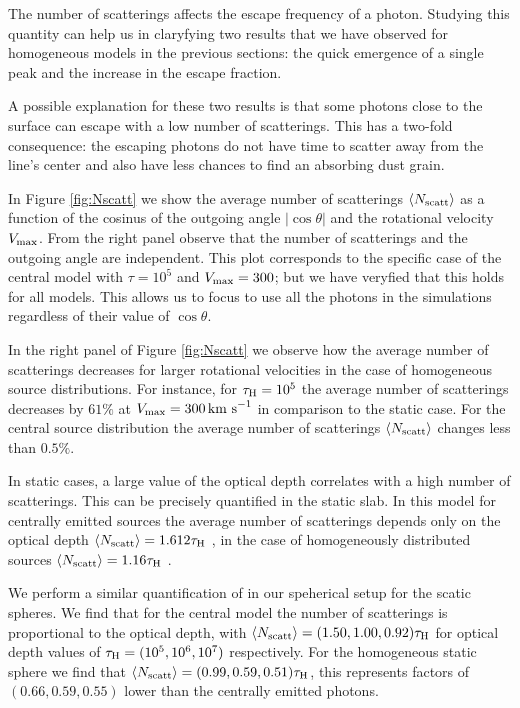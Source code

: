 \documentclass{emulateapj}
\newcommand{\ly}{{\ifmmode{{\rm Ly}\alpha~}\else{Ly$\alpha$~}\fi}}
\newcommand{\kms}{{\ifmmode{{\mathrm{\,km\ s}^{-1}}}\else{\,km~s$^{-1}$}\fi}}
\begin{document}
The number of scatterings affects the escape frequency of a \ly
photon. Studying this quantity can help us in claryfying two results
that we have observed for homogeneous models in the previous sections:
the quick emergence of a single peak and the increase in the escape
fraction.

A possible explanation for these two results is that some photons
close to the surface can escape with a low number of scatterings. This
has a two-fold consequence: the escaping photons do not have time to
scatter away from the line's center and also have less chances to find
an absorbing dust grain.

In Figure \ref{fig:Nscatt} we show the average number of scatterings
$\langle N_{\rm scatt}\rangle$ as a function of the cosinus of the
outgoing angle $|\cos\theta|$ and the rotational velocity
$V_{\rm max}$. From the right panel observe that the number of
scatterings and the outgoing angle are independent. This plot
corresponds to the specific case of the central model with $\tau=10^5$ and
$V_{\rm max}=300$\kms; but we have veryfied that this holds for all
models. This allows us to focus to use all the photons in the
simulations regardless of their value of $\cos\theta$. 

In the right panel of Figure \ref{fig:Nscatt} we observe how the
average number of scatterings decreases for larger rotational
velocities in the case of homogeneous source distributions. For instance, for
$\tau_{\rm H}=10^5$ the average number of scatterings decreases by
$61\%$ at $V_{\rm max}=300\kms$ in comparison to the static case. For
the central source distribution the average number of scatterings
$\langle N_{\rm   scatt}\rangle$ changes less than $0.5\%$. 


In static cases, a large value of the optical depth correlates with a
high number of scatterings.  This can be precisely quantified in the
static slab. In this model for centrally emitted sources the average
number of scatterings depends only on the optical depth $\langle
N_{\rm  scatt}\rangle=1.612\tau_{\rm   H}$
\citep{Adams72,Harrington73}, in the case of homogeneously distributed
sources $\langle N_{\rm   scatt}\rangle=1.16\tau_{\rm   H}$
\citep{Harrington73}.     

We perform a similar quantification of in our speherical setup for the
scatic spheres. We find that for the central model the number of
scatterings is proportional to the optical depth, with $\langle N_{\rm
  scatt}\rangle= (1.50, 1.00, 0.92)\tau_{\rm   H}$ for optical depth
values of $\tau_{\rm H} = (10^{5}, 10^{6}, 10^{7})$ respectively.
For the homogeneous static sphere we find that $\langle N_{\rm
  scatt}\rangle= (0.99, 0.59, 0.51)\tau_{\rm   H}$, this represents
factors of $(0.66, 0.59, 0.55)$ lower than the centrally  emitted photons. 
\end{document}
